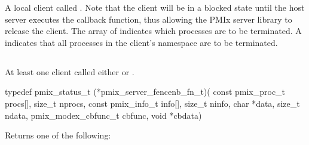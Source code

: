 \descr

A local client called .
Note that the client will be in a blocked state until the host server executes the callback function, thus allowing the \ac{PMIx} server library to release the client.
The array of  indicates which processes are to be terminated.
A  indicates that all processes in the client's namespace are to be terminated.


\subsection{}

\summary

At least one client called either  or .

\format

\cspecificstart
\begin{codepar}
typedef pmix_status_t (*pmix_server_fencenb_fn_t)(
                             const pmix_proc_t procs[],
                             size_t nprocs,
                             const pmix_info_t info[],
                             size_t ninfo,
                             char *data, size_t ndata,
                             pmix_modex_cbfunc_t cbfunc,
                             void *cbdata)
\end{codepar}
\cspecificend

\begin{arglist}
\end{arglist}

Returns one of the following:

